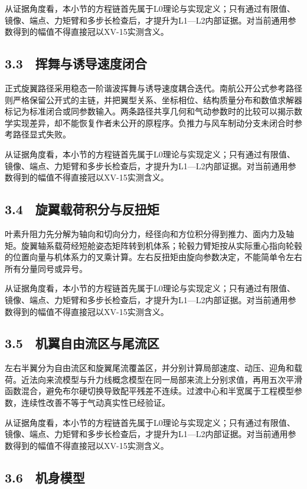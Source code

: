 \documentclass[UTF8,12pt,openany]{ctexbook}
\begin{document}
从证据角度看，本小节的方程链首先属于L0理论与实现定义；只有通过有限值、镜像、端点、力矩臂和多步长检查后，才提升为L1—L2内部证据。对当前通用参数得到的幅值不得直接冠以XV-15实测含义。

\subsection{3.3　挥舞与诱导速度闭合}

正式旋翼路径采用稳态一阶谐波挥舞与诱导速度耦合迭代。南航公开公式参考路径则严格保留公开式的主链，并把翼型关系、坐标相位、结构质量分布和数值求解器标记为标准闭合或同参数输入。两条路径共享几何和气动参数时的比较可以揭示数学实现差异，却不能恢复作者未公开的原程序。负推力与风车制动分支未闭合时参考路径显式失败。

从证据角度看，本小节的方程链首先属于L0理论与实现定义；只有通过有限值、镜像、端点、力矩臂和多步长检查后，才提升为L1—L2内部证据。对当前通用参数得到的幅值不得直接冠以XV-15实测含义。

\subsection{3.4　旋翼载荷积分与反扭矩}

叶素升阻力先分解为轴向和切向分力，经径向和方位积分得到推力、面内力及轴矩。旋翼轴系载荷经短舱姿态矩阵转到机体系；轮毂力臂矩按从实际重心指向轮毂的位置向量与机体系力的叉乘计算。左右反扭矩由旋向参数决定，不能简单令左右所有分量同号或异号。

从证据角度看，本小节的方程链首先属于L0理论与实现定义；只有通过有限值、镜像、端点、力矩臂和多步长检查后，才提升为L1—L2内部证据。对当前通用参数得到的幅值不得直接冠以XV-15实测含义。

\subsection{3.5　机翼自由流区与尾流区}

左右半翼分为自由流区和旋翼尾流覆盖区，并分别计算局部速度、动压、迎角和载荷。近法向来流模型与升力线概念模型在同一局部来流上分别求值，再用五次平滑函数混合，避免布尔硬切换导致配平残差不连续。过渡中心和半宽属于工程模型参数，连续性改善不等于气动真实性已经验证。

从证据角度看，本小节的方程链首先属于L0理论与实现定义；只有通过有限值、镜像、端点、力矩臂和多步长检查后，才提升为L1—L2内部证据。对当前通用参数得到的幅值不得直接冠以XV-15实测含义。

\subsection{3.6　机身模型}
\end{document}
